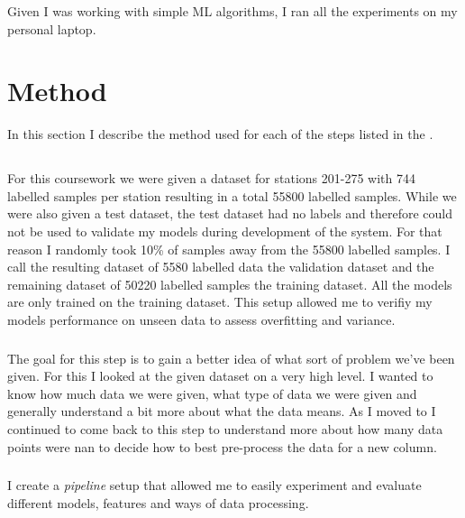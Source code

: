 \documentclass[a4paper]{article}
\begin{document}
    Given I was working with simple ML algorithms, I ran all the experiments on my personal laptop.


    \section{Method}\label{sec:method}

    In this section I describe the method used for each of the steps listed in the .

    \subsection*{}

    For this coursework we were given a dataset for stations 201-275 with 744 labelled samples per station
    resulting in a total 55800 labelled samples. While we were also given a test dataset, the test dataset had no labels
    and therefore could not be used to validate my models during development of the system. For that reason I randomly
    took 10\% of samples away from the 55800 labelled samples. I call the resulting dataset of 5580 labelled data the validation
    dataset and the remaining dataset of 50220 labelled samples the training dataset. All the models are only
    trained on the training dataset. This setup allowed me to verifiy my models performance on unseen data to assess
    overfitting and variance.

    \subsubsection*{}
    The goal for this step is to gain a better idea of what sort of problem we've been given. For this I looked at the
    given dataset on a very high level. I wanted to know how much data we were given, what type of data we were given and
    generally understand
    a bit more about what the data means. As I moved to  I continued to come back to this step
    to understand more about how many data points were nan to decide how to best pre-process the data for a new column.


    \subsubsection*{}
    I create a \textit{pipeline} setup that allowed me to easily experiment and evaluate different models, features and
    ways of data processing.
\end{document}
